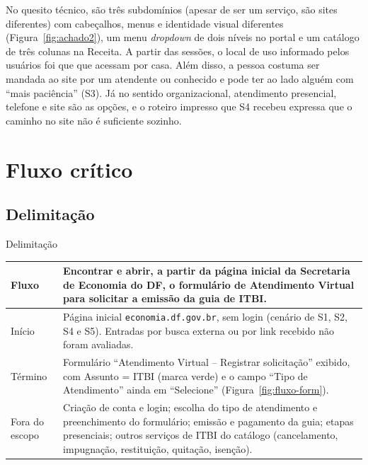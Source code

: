 \documentclass[
  12pt,
  oneside,
  a4paper,
  chapter=TITLE,
  section=TITLE,
  english,
  brazilian
]{abntex2}
\renewcommand{\fonte}[1]{\par\vspace{3pt}{\footnotesize\raggedright\noindent Fonte: #1\par}\vspace{4pt}}%
\begin{document}
No quesito técnico, são três subdomínios (apesar de ser um serviço, são sites diferentes) com cabeçalhos, menus e identidade
visual diferentes (Figura~\ref{fig:achado2}), um menu \textit{dropdown} de dois
níveis no portal e um catálogo de três colunas na Receita. A partir das
sessões, o local de uso informado pelos usuários foi que que acessam por casa. Além disso, a pessoa costuma ser mandada ao site por um atendente ou conhecido
e pode ter ao lado alguém com ``mais paciência'' (S3). Já no sentido organizacional,
atendimento presencial, telefone e site são as opções, e o
roteiro impresso que S4 recebeu expressa que o
caminho no site não é suficiente sozinho.

\chapter{Fluxo crítico}\label{cap:fluxo}

\section{Delimitação}

\begin{quadro}[!htbp]
  \caption{Delimitação}\label{qua:fluxo}
  \centering\small
  \begin{tabularx}{\textwidth}{|P{3.4cm}|Y|}\hline
    Fluxo & Encontrar e abrir, a partir da página inicial da Secretaria de Economia do DF, o formulário de Atendimento Virtual para solicitar a emissão da guia de ITBI. \\\hline
    Início & Página inicial \texttt{economia.df.gov.br}, sem login (cenário de S1, S2, S4 e S5). Entradas por busca externa ou por link recebido não foram avaliadas. \\\hline
    Término & Formulário ``Atendimento Virtual -- Registrar solicitação'' exibido, com Assunto = ITBI (marca verde) e o campo ``Tipo de Atendimento'' ainda em ``Selecione'' (Figura~\ref{fig:fluxo-form}). \\\hline
    Fora do escopo & Criação de conta e login; escolha do tipo de atendimento e preenchimento do formulário; emissão e pagamento da guia; etapas presenciais; outros serviços de ITBI do catálogo (cancelamento, impugnação, restituição, quitação, isenção). \\\hline
  \end{tabularx}
  \fonte{Elaborado pelos autores (2026).}
\end{quadro}
\end{document}
